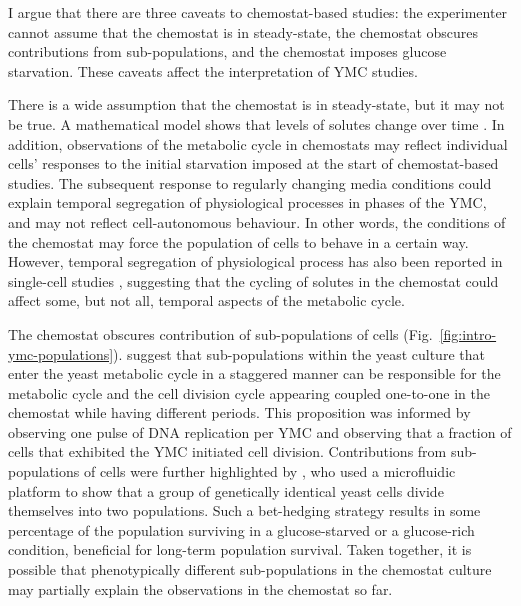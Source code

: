 I argue that there are three caveats to chemostat-based studies:
the experimenter cannot assume that the chemostat is in steady-state,
the chemostat obscures contributions from sub-populations,
and the chemostat imposes glucose starvation.
These caveats affect the interpretation of YMC studies.

There is a wide assumption that the chemostat is in steady-state, but it may not be true.
A mathematical model shows that levels of solutes change over time \parencite{jonesCyberneticModelGrowth1999}.
In addition, observations of the metabolic cycle in chemostats may reflect individual cells' responses to the initial starvation imposed at the start of chemostat-based studies.
The subsequent response to regularly changing media conditions could explain temporal segregation of physiological processes in phases of the YMC, and may not reflect cell-autonomous behaviour.
In other words, the conditions of the chemostat may force the population of cells to behave in a certain way.
However, temporal segregation of physiological process has also been reported in single-cell studies \parencite{takhaveevTemporalSegregationBiosynthetic2023}, suggesting that the cycling of solutes in the chemostat could affect some, but not all, temporal aspects of the metabolic cycle.

The chemostat obscures contribution of sub-populations of cells (Fig.\ \ref{fig:intro-ymc-populations}).
\textcite{burnettiCellCycleStart2016} suggest that sub-populations within the yeast culture that enter the yeast metabolic cycle in a staggered manner can be responsible for the metabolic cycle and the cell division cycle appearing coupled one-to-one in the chemostat while having different periods.
This proposition was informed by observing one pulse of DNA replication per YMC and observing that a fraction of cells that exhibited the YMC initiated cell division.
Contributions from sub-populations of cells were further highlighted by \textcite{bagameryPutativeBetHedgingStrategy2020}, who used a microfluidic platform to show that a group of genetically identical yeast cells divide themselves into two populations.
Such a bet-hedging strategy results in some percentage of the population surviving in a glucose-starved or a glucose-rich condition, beneficial for long-term population survival.
Taken together, it is possible that phenotypically different sub-populations in the chemostat culture may partially explain the observations in the chemostat so far.

